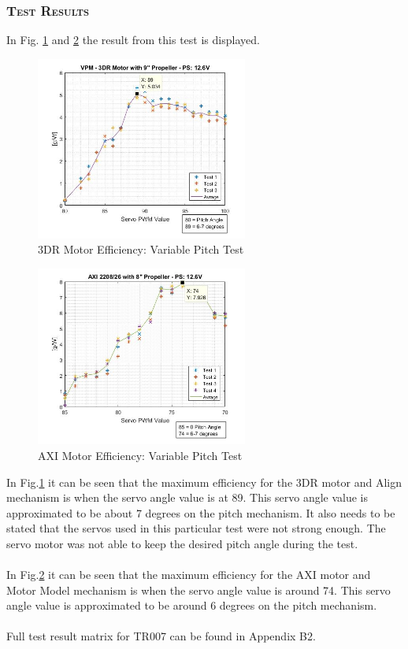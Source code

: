 \subsubsection*{\textsc{\medium Test Results}}
In Fig. \ref{fig:vpm1} and \ref{fig:vpm2} the result from this test is displayed. 
\begin{figure}[H]
    \centering
    \includegraphics[width = 0.62\textwidth]{VAPIQ-PICTURES/3DRxx}
    \caption{3DR Motor Efficiency: Variable Pitch Test}
    \label{fig:vpm1}
\end{figure}
\begin{figure}[H]
    \centering
    \includegraphics[width = 0.62\textwidth]{VAPIQ-PICTURES/Axi2}
    \caption{AXI Motor Efficiency: Variable Pitch Test}
    \label{fig:vpm2}
\end{figure}

\noindent
In Fig.\ref{fig:vpm1} it can be seen that the maximum efficiency for the 3DR motor and Align mechanism is when the servo angle value is at 89. This servo angle value is approximated to be about 7 degrees on the pitch mechanism. It also needs to be stated that the servos used in this particular test were not strong enough. The servo motor was not able to keep the desired pitch angle during the test. \\
\\
In Fig.\ref{fig:vpm2} it can be seen that the maximum efficiency for the AXI motor and Motor Model mechanism is when the servo angle value is around 74. This servo angle value is approximated to be around 6 degrees on the pitch mechanism.\\
\\
Full test result matrix for TR007 can be found in Appendix B2.
\newpage

